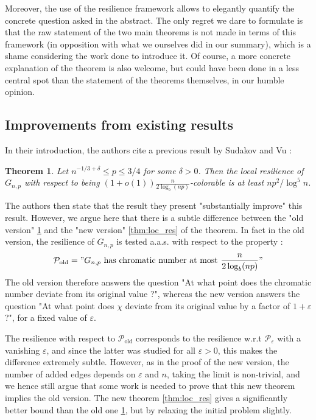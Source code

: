 \documentclass[10pt,journal,a4paper]{IEEEtran}
\newtheorem{theorem}{Theorem}
\theoremstyle{definition}   %
\begin{document}
Moreover, the use of the resilience framework allows to elegantly quantify the concrete question asked in the abstract. The only regret we dare to formulate is that the raw statement of the two main theorems is not made in terms of this framework (in opposition with what we ourselves did in our summary), which is a shame considering the work done to introduce it. Of course, a more concrete explanation of the theorem is also welcome, but could have been done in a less central spot than the statement of the theorems themselves, in our humble opinion.

\subsection{Improvements from existing results}

In their introduction, the authors cite a previous result by Sudakov and Vu \cite{resilience} :

\begin{theorem}
	Let $n^{-1 / 3 + \delta} \leq p \leq 3 / 4$ for some $\delta > 0$. Then the local resilience of $G_{n, p}$ with respect to being $(1 + o(1)) \frac{n}{2 \log_b (np)}$-colorable is at least $n p^2 / \log^5 n $.
	\label{thm:old_bound}
\end{theorem}

The authors then state that the result they present "substantially improve" this result. However, we argue here that there is a subtle difference between the "old version" \ref{thm:old_bound} and the "new version" \ref{thm:loc_res} of the theorem. In fact in the old version, the resilience of $G_{n, p}$ is tested a.a.s. with respect to the property :
$$
\mathcal{P}_\text{old} = "G_{n, p} \text{ has chromatic number at most } \frac{n}{2 \log_b (np)}"
$$
The old version therefore answers the question "At what point does the chromatic number deviate from its original value ?", whereas the new version answers the question "At what point does $\chi$ deviate from its original value by a factor of  $1 + \varepsilon$ ?", for a fixed value of $\varepsilon$.

The resilience with respect to $\mathcal{P}_\text{old}$ corresponds to the resilience w.r.t $\mathcal{P}_\varepsilon$ with a vanishing $\varepsilon$, and since the latter was studied for all $\varepsilon > 0$, this makes the difference extremely subtle. However, as in the proof of the new version, the number of added edges depends on $\varepsilon$ and $n$, taking the limit is non-trivial, and we hence still argue that some work is needed to prove that this new theorem implies the old version. The new theorem \ref{thm:loc_res} gives a significantly better bound than the old one \ref{thm:old_bound}, but by relaxing the initial problem slightly.
\end{document}
